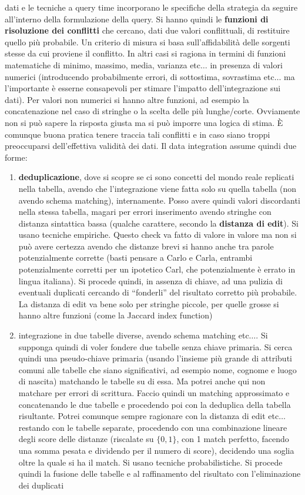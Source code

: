 \documentclass[a4paper,12pt, oneside]{book}
\begin{document}
dati e le tecniche a query time incorporano le specifiche della strategia da
seguire all'interno della formulazione della query. Si hanno quindi le
\textbf{funzioni di risoluzione dei conflitti} che cercano, dati due valori
conflittuali, di restituire quello più probabile. Un criterio di misura si basa
sull'affidabilità delle sorgenti stesse da cui proviene il conflitto. In altri
casi si ragiona in termini di funzioni matematiche di minimo, massimo, media,
varianza etc$\ldots$ in presenza di valori numerici (introducendo probabilmente
errori, di sottostima, sovrastima etc$\ldots$ ma l'importante è esserne
consapevoli per stimare l'impatto dell'integrazione sui dati). Per valori non
numerici si hanno altre funzioni, ad esempio la concatenazione nel caso di
stringhe o la scelta delle più lunghe/corte. Ovviamente non si può sapere la
risposta giusta ma si può imporre una logica di stima. È comunque buona pratica
tenere traccia tali conflitti e in caso siano troppi preoccuparsi dell'effettiva
validità dei dati. Il data integration assume quindi due forme:
\begin{enumerate}
  \item \textbf{deduplicazione}, dove si scopre se ci sono concetti del mondo
  reale replicati nella tabella, avendo che l'integrazione viene fatta solo su
  quella tabella (non avendo schema matching), internamente. Posso avere quindi
  valori discordanti nella stessa tabella, magari per errori inserimento
  avendo stringhe con distanza sintattica bassa (qualche carattere, secondo la
  \textbf{distanza di edit}). Si usano tecniche empiriche. Questo check va fatto
  di valore in valore ma non 
  si può avere certezza avendo che distanze brevi si hanno anche tra parole
  potenzialmente corrette (basti pensare a Carlo e Carla, entrambi
  potenzialmente corretti per un ipotetico Carl, che potenzialmente è errato in
  lingua italiana). Si procede quindi, in assenza di chiave, ad una pulizia di
  eventuali duplicati cercando di ``fonderli'' del risultato corretto più
  probabile. La distanza di edit va bene solo per stringhe piccole, per quelle
  grosse si hanno altre funzioni (come la Jaccard index function)
  \item integrazione in due tabelle diverse, avendo schema matching
  etc$\ldots$. Si supponga quindi di voler fondere due tabelle senza chiave
  primaria. Si cerca quindi una pseudo-chiave primaria (usando l'insieme più
  grande di attributi comuni alle tabelle che siano significativi, ad esempio
  nome, cognome e luogo di nascita) matchando le tabelle su di essa. Ma potrei
  anche qui non matchare per errori di scrittura. Faccio quindi un matching
  approssimato e concatenando le due tabelle e procedendo poi con la deduplica
  della tabella risultante. Potrei comunque sempre ragionare con la distanza di
  edit etc$\ldots$ restando con le tabelle separate, procedendo con una
  combinazione lineare degli score delle distanze (riscalate su $\{0,1\}$, con 1
  match perfetto, facendo una somma pesata e dividendo per il numero di score),
  decidendo una soglia oltre la quale si ha il match. Si usano tecniche
  probabilistiche. Si procede quindi la 
  fusione delle tabelle e al raffinamento del risultato con l'eliminazione dei
  duplicati 
\end{enumerate}
\end{document}
